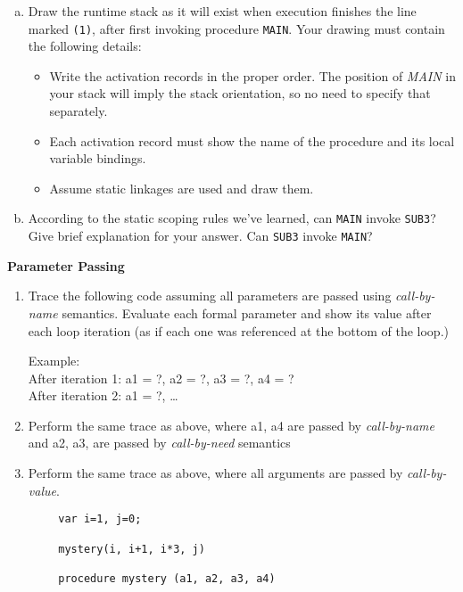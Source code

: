 \documentclass{exam}
\begin{document}
\begin{questions}
\begin{enumerate}[a.]
\item  Draw the runtime stack as it will exist when execution finishes the line marked \verb|(1)|, after first invoking procedure \verb|MAIN|. Your drawing must contain the following details:
\begin{itemize}
\item Write the activation records in the proper order. The position of \emph{MAIN} in your stack will imply the stack orientation, 
so no need to specify that separately.
\item Each activation record must show the name of the procedure and its local variable bindings.
\item Assume static linkages are used and draw them.
\end{itemize}
  
\item According to the static scoping rules we've learned, can \verb|MAIN| invoke \verb|SUB3|? Give brief explanation for your answer. 
Can \verb|SUB3| invoke \verb|MAIN|? 
	
\end{enumerate}


\newpage
\question[10] \textbf{Parameter Passing}

\begin{enumerate}
\item Trace the following code assuming all parameters are passed using \emph{call-by-name} semantics. Evaluate each formal parameter and show its value after each loop iteration (as if each one was referenced at the bottom of the loop.)

{\color{red} Example:\\
After iteration 1: a1 = ?, a2 = ?, a3 = ?, a4 = ?\\
After iteration 2: a1 = ?, \ldots}


\item  Perform the same trace as above, where a1, a4 are passed by \emph{call-by-name} and a2, a3, are passed by \emph{call-by-need} semantics

\item Perform the same trace as above, where all arguments are passed by \emph{call-by-value}.
     
\end{enumerate}

\begin{verbatim}
        var i=1, j=0;
        
        mystery(i, i+1, i*3, j)
        
        procedure mystery (a1, a2, a3, a4)
        		

\end{verbatim}
\end{questions}
\end{document}
